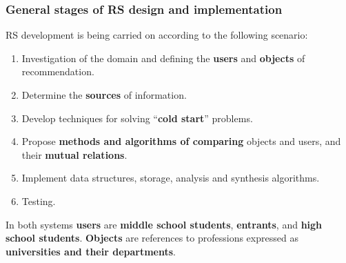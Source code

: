 \documentclass[10pt,dvipsnames]{beamer}
\begin{document}
\begin{frame}
  \frametitle{General stages of RS design and implementation}
  RS development is being carried on according to the following scenario:
  \begin{enumerate}
  \item Investigation of the domain and defining the \textbf{users} and \textbf{objects} of recommendation.
  \item Determine the \textbf{sources} of information.
  \item Develop techniques for solving ``\textbf{cold start}'' problems.
  \item Propose \textbf{methods and algorithms of comparing} objects and users, and their \textbf{mutual relations}.
  \item Implement data structures, storage, analysis and synthesis algorithms.
  \item Testing.
  \end{enumerate}
  In both systems \textbf{users} are \textbf{middle school students}, \textbf{entrants}, and \textbf{high school students}.  \textbf{Objects} are references to professions expressed as \textbf{universities and their departments}.
\end{frame}
\end{document}
